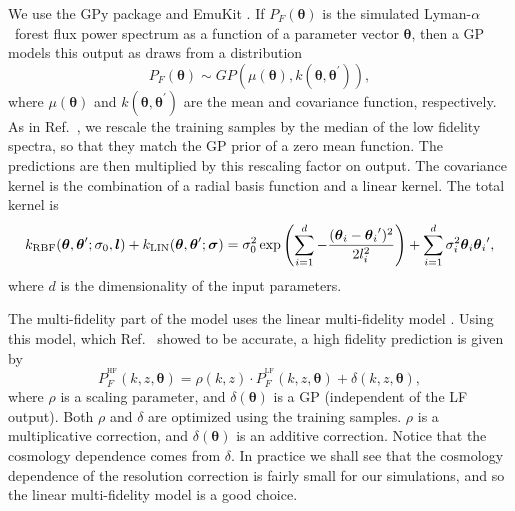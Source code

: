 \documentclass[a4paper,11pt]{article}
\newcommand{\Lya}{Lyman-$\alpha$}
\begin{document}

We use the GPy package \cite{gpy2014} and EmuKit \cite{2021arXiv211013293P}. If $P_F(\boldsymbol{\theta})$ is the simulated \Lya~forest flux power spectrum as a function of a parameter vector $\boldsymbol{\theta}$, then a GP models this output as draws from a distribution
\begin{equation}
    P_F(\boldsymbol{\theta}) \sim GP(\mu(\boldsymbol{\theta}), k(\boldsymbol{\theta}, \boldsymbol{\theta}^{\prime})),
\end{equation}
where $\mu(\boldsymbol{\theta})$ and $k(\boldsymbol{\theta}, \boldsymbol{\theta}^{\prime})$ are the mean and covariance function, respectively.
As in Ref.~\cite{Fernandez:2022}, we rescale the training samples by the median of the low fidelity spectra, so that they match the GP prior of a zero mean function. The predictions are then multiplied by this rescaling factor on output. The covariance kernel is the combination of a radial basis function and a linear kernel. The total kernel is
\begin{equation}
        k_\mathrm{RBF}(\boldsymbol{\theta}, \boldsymbol{\theta}'; \sigma_0, \boldsymbol{l}) + k_\mathrm{LIN}(\boldsymbol{\theta}, \boldsymbol{\theta}'; \boldsymbol{\sigma})\\
        = \sigma_0^2 \exp{\left( \sum_{i=1}^{d} -\frac{(\boldsymbol{\theta}_i - {\boldsymbol{\theta}_i}')^2}{2 l_i^2} \right)} +  \sum_{i=1}^{d} \sigma_i^2 \boldsymbol{\theta}_i {\boldsymbol{\theta}_i}',
        \label{eq:kernel}
\end{equation}
where $d$ is the dimensionality of the input parameters.

The multi-fidelity part of the model uses the linear multi-fidelity model \citep{10.1093/biomet/87.1.1}. Using this model, which Ref.~\cite{Fernandez:2022} showed to be accurate, a high fidelity prediction is given by
\begin{equation}
    P_F^{^\mathrm{HF}}(k, z, \boldsymbol{\theta}) = \rho(k, z) \cdot P_F^{^\mathrm{LF}}(k, z, \boldsymbol{\theta}) + \delta(k, z, \boldsymbol{\theta}),
    \label{eq:ko_model}
\end{equation}
where $\rho$ is a scaling parameter, and $\delta(\boldsymbol{\theta})$ is a GP (independent of the LF output). Both $\rho$ and $\delta$ are optimized using the training samples. $\rho$ is a multiplicative correction, and $\delta(\boldsymbol{\theta})$ is an additive correction. Notice that the cosmology dependence comes from $\delta$. In practice we shall see that the cosmology dependence of the resolution correction is fairly small for our simulations, and so the linear multi-fidelity model is a good choice.
\end{document}
